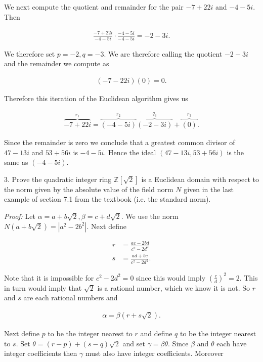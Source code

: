 \documentclass[11pt]{article}
\begin{document}
We next compute the quotient and remainder for the pair $-7+22i$ and $-4-5i$.  Then 

\begin{align*}
    \frac{-7+22i}{-4-5i}\cdot \frac{-4-5i}{-4-5i} = -2-3i.
\end{align*}

We therefore set $p=-2,q=-3$.  We are therefore calling the quotient $-2-3i$ and the remainder we compute as 

\begin{align*}
    (-7-22i)\left(0\right) = 0.
\end{align*}

Therefore this iteration of the Euclidean algorithm gives us 

\begin{align*}
    \overbrace{-7+22i}^{r_1}=\overbrace{(-4-5i)}^{r_2}\overbrace{(-2-3i)}^{q_3} + \overbrace{(0)}^{r_3}.
\end{align*}

Since the remainder is zero we conclude that a greatest common divisor of $47-13i$ and $53+56i$ is $-4-5i$.  Hence the ideal $(47-13i, 53+56i)$ is the same as $(-4-5i)$.  

3.  Prove the quadratic integer ring $\mathbb Z[\sqrt 2]$ is a Euclidean domain with respect to the norm given by the absolute value of the field norm $N$ given in the last example of section 7.1 from the textbook (i.e. the standard norm).

{\it Proof:} Let $\alpha=a+b\sqrt 2, \beta = c+d\sqrt 2$.  We use the norm $N(a+b\sqrt 2) = |a^2 - 2b^2|$.  Next define 

\begin{align*}
    r &= \frac{ac-2bd}{c^2-2d^2} \\
    s &= \frac{ad+bc}{c^2-2d^2}.
\end{align*}

Note that it is impossible for $c^2-2d^2=0$ since this would imply $\left(\frac{c}{d}\right)^2 = 2$.  This in turn would imply that $\sqrt 2$ is a rational number, which we know it is not.  So $r$ and $s$ are each rational numbers and 

\begin{align*}
    \alpha = \beta(r+s\sqrt{2}).
\end{align*}

Next define $p$ to be the integer nearest to $r$ and define $q$ to be the integer nearest to $s$.  Set $\theta = (r-p)+(s-q)\sqrt 2$ and set $\gamma = \beta \theta$.  Since $\beta$ and $\theta$ each have integer coefficients then $\gamma$ must also have integer coefficients.  Moreover  
\end{document}
